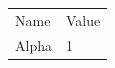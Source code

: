 \documentclass{article}
\begin{document}
\begin{tabular}{ll}
Name & Value \\
Alpha & 1
\end{tabular}
\end{document}
